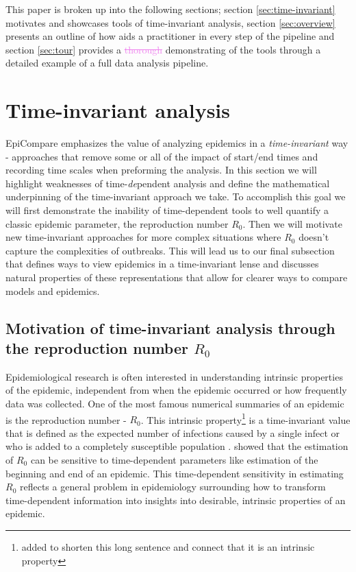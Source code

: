 \documentclass[
  shortnames]{jss}
\begin{document}
This paper is broken up into the following sections; section
\ref{sec:time-invariant} motivates and showcases tools of time-invariant
analysis, section \ref{sec:overview} presents an outline of how
 aids a practitioner in every step of the pipeline and
section \ref{sec:tour} provides a \textcolor{violet}{\sout{thorough}}
demonstrating of the tools through a detailed example of a full data
analysis pipeline.

\hypertarget{time-invariant-analysis}{%
\section{Time-invariant analysis}\label{time-invariant-analysis}}

EpiCompare emphasizes the value of analyzing epidemics in a
\textit{time-invariant} way - approaches that remove some or all of the
impact of start/end times and recording time scales when preforming the
analysis. In this section we will highlight weaknesses of
time-\textit{de}pendent analysis and define the mathematical
underpinning of the time-invariant approach we take. To accomplish this
goal we will first demonstrate the inability of time-dependent tools to
well quantify a classic epidemic parameter, the reproduction number
\(R_0\). Then we will motivate new time-invariant approaches for more
complex situations where \(R_0\) doesn't capture the complexities of
outbreaks. This will lead us to our final subsection that defines ways
to view epidemics in a time-invariant lense and discusses natural
properties of these representations that allow for clearer ways to
compare models and epidemics.

\subsection[Motivation through the reproduction number $R_0$]{Motivation
of time-invariant analysis through the reproduction number
\(R_0\)}\label{sec:r0_subsection}

Epidemiological research is often interested in understanding intrinsic
properties of the epidemic, independent from when the epidemic occurred
or how frequently data was collected. One of the most famous numerical
summaries of an epidemic is the reproduction number - \(R_0\). This
intrinsic
property\footnote{added to shorten this long sentence and connect that it is an intrinsic property}
is a time-invariant value that is defined as the expected number of
infections caused by a single infect or who is added to a completely
susceptible population \citep{anderson1992}. \citet{Gallagher2020}
showed that the estimation of \(R_0\) can be sensitive to time-dependent
parameters like estimation of the beginning and end of an epidemic. This
time-dependent sensitivity in estimating \(R_0\) reflects a general
problem in epidemiology surrounding how to transform time-dependent
information into insights into desirable, intrinsic properties of an
epidemic.
\end{document}
